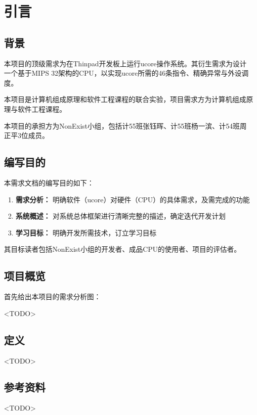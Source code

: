 \chapter{引言}

\section{背景}

本项目的顶级需求为在Thinpad开发板上运行ucore操作系统。其衍生需求为设计一个基于MIPS 32架构的CPU，以实现ucore所需的46条指令、精确异常与外设调度。

本项目是计算机组成原理和软件工程课程的联合实验，项目需求方为计算机组成原理与软件工程课程。

本项目的承担方为NonExist小组，包括计55班张钰晖、计55班杨一滨、计54班周正平3位成员。

\section{编写目的}

本需求文档的编写目的如下：

\begin{enumerate}
    \item {\bf 需求分析：} 明确软件（ucore）对硬件（CPU）的具体需求，及需完成的功能
    \item {\bf 系统概述：} 对系统总体框架进行清晰完整的描述，确定迭代开发计划
    \item {\bf 学习目标：} 明确开发所需技术，订立学习目标
\end{enumerate}

其目标读者包括NonExist小组的开发者、成品CPU的使用者、项目的评估者。

\section{项目概览}

首先给出本项目的需求分析图：

<TODO>

\section{定义}

<TODO>

\section{参考资料}

<TODO>
